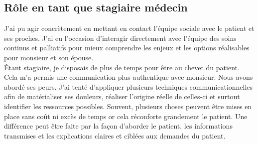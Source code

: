 \subsection{Rôle en tant que stagiaire médecin} 

J’ai pu agir concrètement en mettant en contact l’équipe sociale avec le patient et ses proches. J’ai eu l’occasion d’interagir directement avec l’équipe des soins continus et palliatifs pour mieux comprendre les enjeux et les options réalisables pour monsieur et son épouse.\\ 

Étant stagiaire, je disposais de plus de temps pour être au chevet du patient. Cela m’a permis une communication plus authentique avec monsieur. Nous avons abordé ses peurs. J’ai tenté d’appliquer plusieurs techniques communicationnelles afin de matérialiser ses douleurs, réaliser l’origine réelle de celles-ci et surtout identifier les ressources possibles. Souvent, plusieurs choses peuvent être mises en place sans coût ni excès de temps or cela réconforte grandement le patient. Une différence peut être faite par la façon d’aborder le patient, les informations transmises et les explications claires et ciblées aux demandes du patient.  

 
